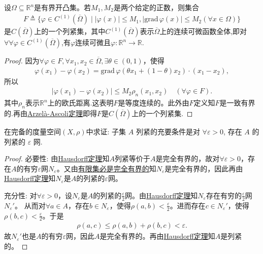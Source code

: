 \documentclass[../../main.tex]{subfiles}%
\begin{document}
\begin{example}
设$\Omega\subseteq\mathbb{R}^n$是有界开凸集。若$M_1,M_2$是两个给定的正数，则集合
\begin{align*}
F\triangleq\{\varphi\in C^{(1)}(\overline{\Omega})\mid |\varphi(x)|\leqslant M_1,|\mathrm{grad}\,\varphi(x)|\leqslant M_2(\forall x\in\Omega)\}
\end{align*}
是$C(\overline{\Omega})$上的一个列紧集，其中$C^{(1)}(\overline{\Omega})$表示$\overline{\Omega}$上的连续可微函数全体,即对$\forall \forall \varphi\in C^{(1)}(\overline{\Omega})$,有$\varphi$连续可微且$\varphi:\mathbb{R}^n\to \mathbb{R}$.
\end{example}
\begin{proof}

因为$\forall\varphi\in F,\forall x_1,x_2\in\overline{\Omega},\exists\theta\in(0,1)$，使得
\begin{align*}
\varphi(x_1)-\varphi(x_2)=\mathrm{grad}\,\varphi(\theta x_1+(1-\theta)x_2)\cdot(x_1-x_2),
\end{align*}
所以
\begin{align*}
|\varphi(x_1)-\varphi(x_2)|\leqslant M_2\rho_n(x_1,x_2)\quad (\forall\varphi\in F).
\end{align*}
其中$\rho_n$表示$\mathbb{R}^n$上的欧氏距离.这表明$F$是等度连续的。此外由$F$定义知$F$是一致有界的.再由\hyperref[theorem:泛函分析--Arzelà-Ascoli定理]{Arzelà-Ascoli定理}即得$F$是$C(\overline{\Omega})$上的一个列紧集.

\end{proof}

\begin{example}
在完备的度量空间$(X,\rho)$中求证: 子集 $A$ 列紧的充要条件是对 $\forall \varepsilon > 0$, 存在 $A$ 的列紧的 $\varepsilon$ 网.
\end{example}
\begin{proof}

{\heiti 必要性:} 由\hyperref[theorem:泛函分析--Hausdorff定理]{Hausdorff定理}知$A$列紧等价于$A$是完全有界的，故对$\forall \varepsilon >0$，存在$A$的有穷$\varepsilon$网$N_{\varepsilon}$。又由\hyperref[proposition:完全有界必有界-2]{有限集必是完全有界的}知$N_{\varepsilon}$是完全有界的，因此再由\hyperref[theorem:泛函分析--Hausdorff定理]{Hausdorff定理}知$N_{\varepsilon}$是$A$的列紧的$\varepsilon$网。

{\heiti 充分性:} 对$\forall \varepsilon >0$，设$N_{\varepsilon}$是$A$的列紧的$\frac{\varepsilon}{2}$网。由\hyperref[theorem:泛函分析--Hausdorff定理]{Hausdorff定理}知$N_{\varepsilon}$存在有穷的$\frac{\varepsilon}{2}$网$N_{\varepsilon}'$。
从而对$\forall a\in A$，存在$b\in N_{\varepsilon}$，使得$\rho(a,b)<\frac{\varepsilon}{2}$。进而存在$c\in N_{\varepsilon}'$，使得$\rho(b,c)<\frac{\varepsilon}{2}$。于是
\begin{align*}
\rho(a,c)\leqslant\rho(a,b)+\rho(b,c)<\varepsilon.
\end{align*}
故$N_{\varepsilon}'$也是$A$的有穷$\varepsilon$网，因此$A$是完全有界的。再由\hyperref[theorem:泛函分析--Hausdorff定理]{Hausdorff定理}知$A$是列紧的。

\end{proof}
\end{document}
